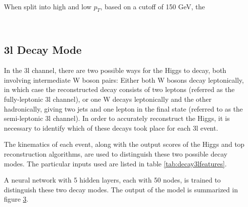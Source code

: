 \begin{figure}[h!]
    \\                     
    \caption{}
    \label{fig:pt3lFresults}
\end{figure}

When split into high and low $p_T$, based on a cutoff of 150 GeV, the 

\begin{figure}[h!]                                                                                                           
    \\
    \caption{}
    \label{fig:pt3lFroc}
\end{figure}

\subsection{3l Decay Mode}
\label{sec:decay3l}

In the 3l channel, there are two possible ways for the Higgs to decay, both involving intermediate W boson pairs: Either both W bosons decay leptonically, in which case the reconstructed decay consists of two leptons (referred as the fully-leptonic 3l channel), or one W decays leptonically and the other hadronically, giving two jets and one lepton in the final state (referred to as the semi-leptonic 3l channel). In order to accurately reconstruct the Higgs, it is necessary to identify which of these decays took place for each 3l event.

The kinematics of each event, along with the output scores of the Higgs and top reconstruction algorithms, are used to distinguish these two possible decay modes. The particular inputs used are listed in table \ref{tab:decay3lfeatures}.



A neural network with 5 hidden layers, each with 50 nodes, is trained to distinguish these two decay modes. The output of the model is summarized in figure \ref{fig:decayResults}.

\begin{figure}[h!]
    \\
    \caption{}
    \label{fig:decayResults}
\end{figure}



